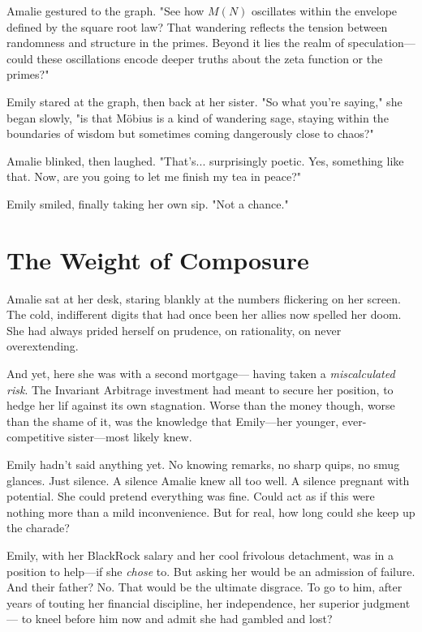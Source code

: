 Amalie gestured to the graph. "See how \(M(N)\) oscillates within the envelope defined by the square root law? That wandering reflects the tension between randomness and structure in the primes. Beyond it lies the realm of speculation—could these oscillations encode deeper truths about the zeta function or the primes?"

Emily stared at the graph, then back at her sister. "So what you’re saying," she began slowly, "is that Möbius is a kind of wandering sage, staying within the boundaries of wisdom but sometimes coming dangerously close to chaos?"

Amalie blinked, then laughed. "That’s... surprisingly poetic. Yes, something like that. Now, are you going to let me finish my tea in peace?"

Emily smiled, finally taking her own sip. "Not a chance."
\newpage
\section*{The Weight of Composure}

Amalie sat at her desk, staring blankly at the numbers flickering on her screen. The cold, indifferent digits that had once been her allies now spelled her doom. She had always prided herself on prudence, on rationality, on never overextending. 

And yet, here she was with a second mortgage— having taken a
\textit{miscalculated risk}. The Invariant Arbitrage investment had meant to secure her position, to hedge her lif against its own stagnation. Worse than the money though, worse than the shame of it, was the knowledge that Emily—her younger, ever-competitive sister—most likely knew. 

\smallskip

Emily hadn’t said anything yet. No knowing remarks, no sharp quips, no smug glances. Just silence. A silence Amalie knew all too well. A silence pregnant with potential. She could pretend everything was fine. Could act as if this were nothing more than a mild inconvenience. But for real, how long could she keep up the charade? 

\smallskip

Emily, with her BlackRock salary and her cool frivolous detachment, was in a position to help—if she \textit{chose} to. But asking her would be an admission of failure. And their father? No. That would be the ultimate disgrace. To go to him, after years of touting her financial discipline, her independence, her superior judgment — to kneel before him now and admit she had gambled and lost?

